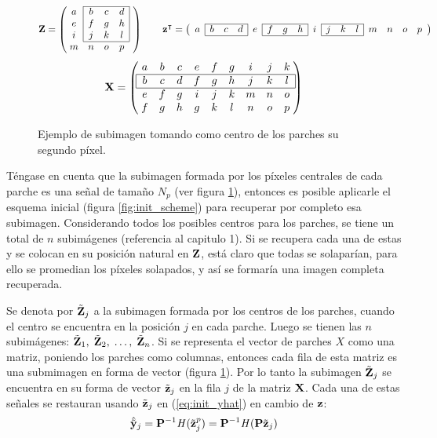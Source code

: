 \begin{figure}[H]
	\[\Z = \left(
		\;\begin{matrix}
		\cline{2-4}
			a & \multicolumn{1}{|c}{b} & c & \multicolumn{1}{c|}{d}\\
			e & \multicolumn{1}{|c}{f} & g & \multicolumn{1}{c|}{h}\\
			i & \multicolumn{1}{|c}{j} & k & \multicolumn{1}{c|}{l}\\\cline{2-4}
			m & n & o & p\\
		\end{matrix}\;\;\;
	\right)
	\qquad\z^\intercal = \left(
		\begin{array}{c|ccc|c|ccc|c|ccc|cccc}
			\cline{2-4}\cline{6-8}\cline{10-12}
			a & b & c & d & e & f & g & h & i & j & k & l & m & n & o & p \\
			\cline{2-4}\cline{6-8}\cline{10-12}
		\end{array}
	\right)
	\]
	\[
	\X = \left(
		\;\begin{matrix}
			a & b & c & e & f & g & i & j & k\\\hline
			\multicolumn{1}{|c}{b} & c & d & f & g & h & j & k & \multicolumn{1}{c|}{l}\\\hline
			e & f & g & i & j & k & m & n & o\\
			f & g & h & g & k & l & n & o & p\\
		\end{matrix}\;
	\right)
	\]
	\caption{Ejemplo de subimagen tomando como centro de los parches su segundo p\'ixel.}
	\label{ex:subimages}
\end{figure}

Téngase en cuenta que la subimagen formada por los p\'ixeles centrales de cada parche es una señal de tamaño $N_p$ (ver figura \ref{ex:subimages}), entonces es posible aplicarle el esquema inicial (figura \ref{fig:init_scheme}) para recuperar por completo esa subimagen. Considerando todos los posibles centros para los parches, se tiene un total de $n$ subim\'agenes (referencia al capitulo 1). Si se recupera cada una de estas y se colocan en su posición natural en $\mathbf{Z}$, est\'a claro que todas se solapar\'ian, para ello se promedian los p\'ixeles solapados, y así se formar\'ia una imagen completa recuperada. 

Se denota por $\tilde{\mathbf{Z}}_j$ a la subimagen formada por los centros de los parches, cuando el centro se encuentra en la posici\'on $j$ en cada parche. Luego se tienen las $n$ subim\'agenes: $\tilde{\mathbf{Z}}_1,\; \tilde{\mathbf{Z}}_2,\; \dots,\; \tilde{\mathbf{Z}}_n$. Si se representa el vector de parches $X$ como una matriz, poniendo los parches como columnas, entonces cada fila de esta matriz es una submimagen en forma de vector (figura \ref{ex:subimages}). Por lo tanto la subimagen $\tilde{\mathbf{Z}}_j$ se encuentra en su forma de vector $\tilde{\mathbf{z}}_j$ en la fila $j$ de la matriz $\mathbf{X}$. Cada una de estas señales se restauran usando $\tilde{\mathbf{z}}_j$ en (\ref{eq:init_yhat}) en cambio de $\mathbf{z}$:
\begin{equation}
	\hat{\tilde{\mathbf{y}}}_j = \mathbf{P}^{-1}\mathit{H}(\tilde{\mathbf{z}}_j^p) = \mathbf{P}^{-1}\mathit{H}(\mathbf{P}\tilde{\mathbf{z}}_j)
	\label{eq:subimage_yhat}
\end{equation}

